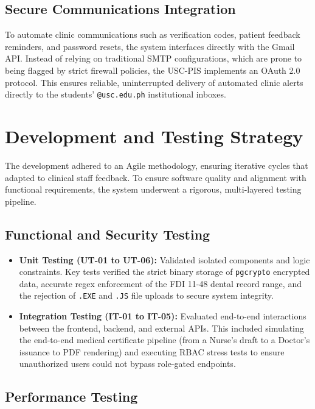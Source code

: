 \subsection{Secure Communications Integration}
To automate clinic communications such as verification codes, patient feedback reminders, and password resets, the system interfaces directly with the Gmail API. Instead of relying on traditional SMTP configurations, which are prone to being flagged by strict firewall policies, the USC-PIS implements an OAuth 2.0 protocol. This ensures reliable, uninterrupted delivery of automated clinic alerts directly to the students' \texttt{@usc.edu.ph} institutional inboxes.

\section{Development and Testing Strategy}

The development adhered to an Agile methodology, ensuring iterative cycles that adapted to clinical staff feedback. To ensure software quality and alignment with functional requirements, the system underwent a rigorous, multi-layered testing pipeline.

\subsection{Functional and Security Testing}

\begin{itemize}
    \item \textbf{Unit Testing (UT-01 to UT-06):} Validated isolated components and logic constraints. Key tests verified the strict binary storage of \texttt{pgcrypto} encrypted data, accurate regex enforcement of the FDI 11-48 dental record range, and the rejection of \texttt{.EXE} and \texttt{.JS} file uploads to secure system integrity.
    \item \textbf{Integration Testing (IT-01 to IT-05):} Evaluated end-to-end interactions between the frontend, backend, and external APIs. This included simulating the end-to-end medical certificate pipeline (from a Nurse's draft to a Doctor's issuance to PDF rendering) and executing RBAC stress tests to ensure unauthorized users could not bypass role-gated endpoints.
\end{itemize}

\subsection{Performance Testing}

